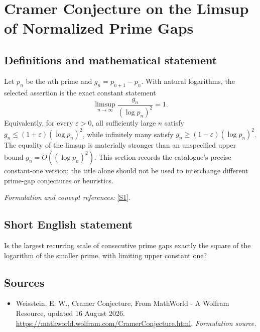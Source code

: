 \documentclass[11pt]{article}
\begin{document}
\section*{\texorpdfstring{Cramer Conjecture on the Limsup of Normalized Prime Gaps}{Cramer Conjecture on the Limsup of Normalized Prime Gaps}}\label{30006761}
\subsection{Definitions and mathematical statement}
Let $p_n$ be the $n$th prime and $g_n=p_{n+1}-p_n$. With natural logarithms, the selected assertion is the exact constant statement
\[
 \limsup_{n\to\infty}\frac{g_n}{(\log p_n)^2}=1.
\]
Equivalently, for every ${\varepsilon}>0$, all sufficiently large $n$ satisfy
$g_n\le(1+{\varepsilon})(\log p_n)^2$, while infinitely many satisfy
$g_n\ge(1-{\varepsilon})(\log p_n)^2$. The equality of the limsup is materially stronger than an unspecified upper bound $g_n=O((\log p_n)^2)$. This section records the catalogue's precise constant-one version; the title alone should not be used to interchange different prime-gap conjectures or heuristics.
\par\smallskip\textit{Formulation and concept references:} \href{https://mathworld.wolfram.com/CramerConjecture.html}{[S1]}.

\subsection{Short English statement}
Is the largest recurring scale of consecutive prime gaps exactly the square of the logarithm of the smaller prime, with limiting upper constant one?
\subsection{Sources}
\begin{itemize}
\item[S1]Weisstein, E. W., Cramer Conjecture, From MathWorld - A Wolfram Resource, updated 16 August 2026.
\url{https://mathworld.wolfram.com/CramerConjecture.html}.
\textit{Formulation source.}
\end{itemize}
\end{document}
